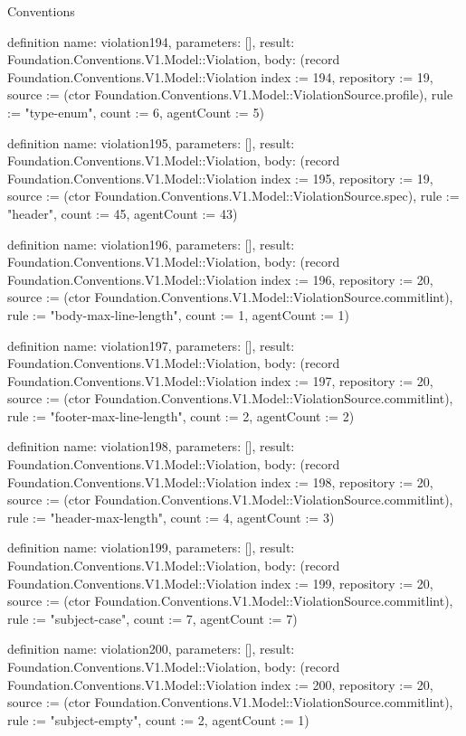 \begin{lexlean}{Conventions}
\begin{semanticmodule}
definition{
  name: violation194,
  parameters: [],
  result: Foundation.Conventions.V1.Model::Violation,
  body: (record Foundation.Conventions.V1.Model::Violation {index := 194, repository := 19, source := (ctor Foundation.Conventions.V1.Model::ViolationSource.profile), rule := "type-enum", count := 6, agentCount := 5})
}

definition{
  name: violation195,
  parameters: [],
  result: Foundation.Conventions.V1.Model::Violation,
  body: (record Foundation.Conventions.V1.Model::Violation {index := 195, repository := 19, source := (ctor Foundation.Conventions.V1.Model::ViolationSource.spec), rule := "header", count := 45, agentCount := 43})
}

definition{
  name: violation196,
  parameters: [],
  result: Foundation.Conventions.V1.Model::Violation,
  body: (record Foundation.Conventions.V1.Model::Violation {index := 196, repository := 20, source := (ctor Foundation.Conventions.V1.Model::ViolationSource.commitlint), rule := "body-max-line-length", count := 1, agentCount := 1})
}

definition{
  name: violation197,
  parameters: [],
  result: Foundation.Conventions.V1.Model::Violation,
  body: (record Foundation.Conventions.V1.Model::Violation {index := 197, repository := 20, source := (ctor Foundation.Conventions.V1.Model::ViolationSource.commitlint), rule := "footer-max-line-length", count := 2, agentCount := 2})
}

definition{
  name: violation198,
  parameters: [],
  result: Foundation.Conventions.V1.Model::Violation,
  body: (record Foundation.Conventions.V1.Model::Violation {index := 198, repository := 20, source := (ctor Foundation.Conventions.V1.Model::ViolationSource.commitlint), rule := "header-max-length", count := 4, agentCount := 3})
}

definition{
  name: violation199,
  parameters: [],
  result: Foundation.Conventions.V1.Model::Violation,
  body: (record Foundation.Conventions.V1.Model::Violation {index := 199, repository := 20, source := (ctor Foundation.Conventions.V1.Model::ViolationSource.commitlint), rule := "subject-case", count := 7, agentCount := 7})
}

definition{
  name: violation200,
  parameters: [],
  result: Foundation.Conventions.V1.Model::Violation,
  body: (record Foundation.Conventions.V1.Model::Violation {index := 200, repository := 20, source := (ctor Foundation.Conventions.V1.Model::ViolationSource.commitlint), rule := "subject-empty", count := 2, agentCount := 1})
}


\end{semanticmodule}
\end{lexlean}

